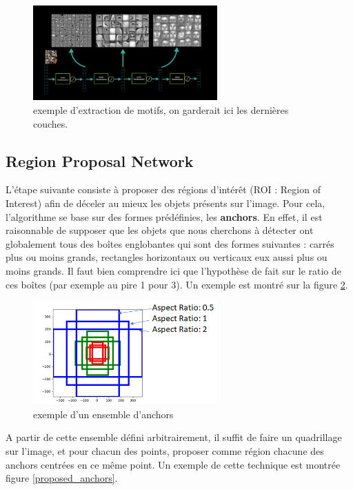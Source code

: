 \begin{figure}[!h]
\centering
\includegraphics[width=200pt]{images/Mask_R_CNN/resnet_extraction.png} 
\caption{exemple d'extraction de motifs, on garderait ici les dernières couches.}
\label{resnet_extraction}
\end{figure}

\subsection{Region Proposal Network}

L'étape suivante consiste à proposer des régions d'intérêt (ROI : Region of Interest) afin de déceler au mieux les objets présents sur l'image. Pour cela, l'algorithme se base sur des formes prédéfinies, les \textbf{anchors}. En effet, il est raisonnable de supposer que les objets que nous cherchons à détecter ont globalement tous des boîtes englobantes qui sont des formes suivantes : carrés plus ou moins grands, rectangles horizontaux ou verticaux eux aussi plus ou moins grands. Il faut bien comprendre ici que l'hypothèse de fait sur le ratio de ces boîtes (par exemple au pire 1 pour 3). Un exemple est montré sur la figure \ref{anchors}.

\begin{figure}[!h]
\centering
\includegraphics[width=200pt]{images/Mask_R_CNN/anchors.png} 
\caption{exemple d'un ensemble d'anchors}
\label{anchors}
\end{figure}

A partir de cette ensemble défini arbitrairement, il suffit de faire un quadrillage sur l'image, et pour chacun des points, proposer comme région chacune des anchors centrées en ce même point. Un exemple de cette technique est montrée figure \ref{proposed_anchors}.

